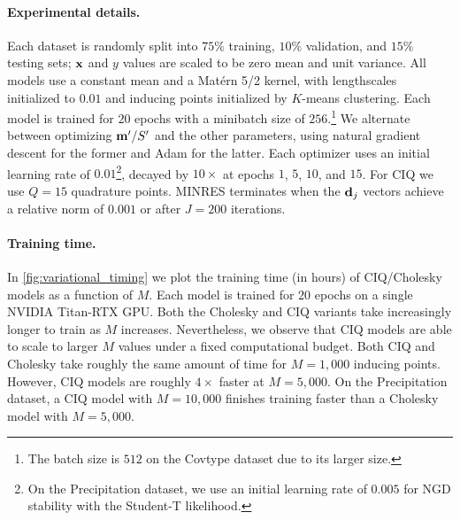 \paragraph{Experimental details.}
Each dataset is randomly split into $75\%$ training, $10\%$ validation, and $15\%$ testing sets; $\mathbf{x}$ and $y$ values are scaled to be zero mean and unit variance.
All models use a constant mean and a Mat\'ern 5/2 kernel, with lengthscales initialized to $0.01$ and inducing points initialized by $K$-means clustering.
Each model is trained for $20$ epochs with a minibatch size of $256.$\footnote{
  The batch size is $512$ on the Covtype dataset due to its larger size.
}
We alternate between optimizing $\mathbf{m}'/S'$ and the other parameters, using natural gradient descent for the former and Adam \cite{kingma2014adam} for the latter.
Each optimizer uses an initial learning rate of $0.01$\footnote{
  On the Precipitation dataset, we use an initial learning rate of $0.005$ for  NGD stability with the Student-T likelihood.
}, decayed by $10\times$ at epochs $1$, $5$, $10$, and $15$.
For CIQ we use $Q = 15$ quadrature points.
MINRES terminates when the $\mathbf{d}_j$ vectors achieve a relative norm of $0.001$ or after $J=200$ iterations.

\paragraph{Training time.}
In \cref{fig:variational_timing} we plot the training time (in hours) of CIQ/Cholesky models as a function of $M$.
Each model is trained for $20$ epochs on a single NVIDIA Titan-RTX GPU.
Both the Cholesky and CIQ variants take increasingly longer to train as $M$ increases.
Nevertheless, we observe that CIQ models are able to scale to larger $M$ values under a fixed computational budget.
Both CIQ and Cholesky take roughly the same amount of time for $M=1,\!000$ inducing points.
However, CIQ models are roughly $4\times$ faster at $M=5,\!000$.
On the Precipitation dataset, a CIQ model with $M=10,\!000$ finishes training faster than a Cholesky model with $M=5,\!000$.

